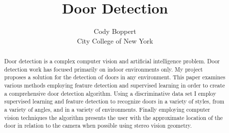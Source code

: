\documentclass[twocolumn,nofootinbib,%
notitlepage,10pt]{report}
\begin{document}
\title{Door Detection}
\author{Cody Boppert\\City College of New York}

\maketitle

\begin{abstract}
Door detection is a complex computer vision and artificial intelligence problem. Door detection work has focused primarily on indoor environments only. My project proposes a solution for the detection of doors in any environment. This paper examines various methods employing feature detection and supervised learning in order to create a comprehensive door detection algorithm. Using a discriminative data set I employ supervised learning and feature detection to recognize doors in a variety of styles, from a variety of angles, and in a variety of environments. Finally employing computer vision techniques the algorithm presents the user with the approximate location of the door in relation to the camera when possible using stereo vision geometry.
\end{abstract}
\end{document}

